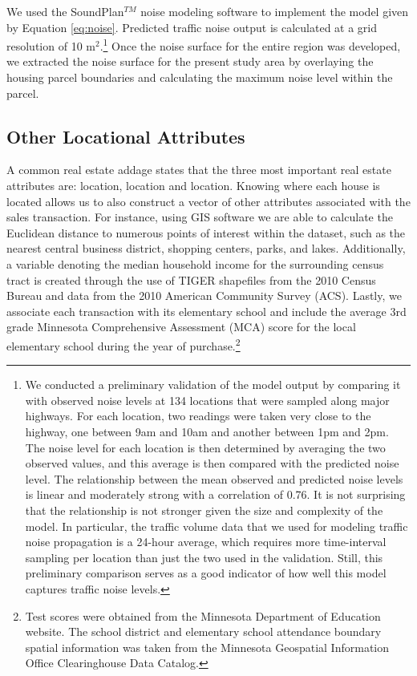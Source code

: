 \documentclass{article}\usepackage{graphicx, color}
\begin{document}
We used the SoundPlan$^{TM}$ noise modeling software to implement the model given by Equation \ref{eq:noise}. Predicted traffic noise output is calculated at a grid resolution of 10 m$^2$.\footnote{We conducted a preliminary validation of the model output by comparing it with observed noise levels at 134 locations that were sampled along major highways. For each location, two readings were taken very close to the highway, one between 9am and 10am and another between 1pm and 2pm. The noise level for each location is then determined by averaging the two observed values, and this average is then compared with the predicted noise level. The relationship between the mean observed and predicted noise levels is linear and moderately strong with a correlation of 0.76. It is not surprising that the relationship is not stronger given the size and complexity of the model. In particular, the traffic volume data that we used for modeling traffic noise propagation is a 24-hour average, which requires more time-interval sampling per location than just the two used in the validation. Still, this preliminary comparison serves as a good indicator of how well this model captures traffic noise levels.} Once the noise surface for the entire region was developed, we extracted the noise surface for the present study area by overlaying the housing parcel boundaries and calculating the maximum noise level within the parcel.

\subsection{Other Locational Attributes}
A common real estate addage states that the three most important real estate attributes are: location, location and location. Knowing where each house is located allows us to also construct a vector of other attributes associated with the sales transaction. For instance, using GIS software we are able to calculate the Euclidean distance to numerous points of interest within the dataset, such as the nearest central business district, shopping centers, parks, and lakes. Additionally, a variable denoting the median household income for the surrounding census tract is created through the use of TIGER shapefiles from the 2010 Census Bureau and data from the 2010 American Community Survey (ACS). Lastly, we associate each transaction with its elementary school and include the average 3rd grade Minnesota Comprehensive Assessment (MCA) score for the local elementary school during the year of purchase.\footnote{Test scores were obtained from the Minnesota Department of Education website. The school district and elementary school attendance boundary spatial information was taken from the Minnesota Geospatial Information Office Clearinghouse Data Catalog.} 
\end{document}
